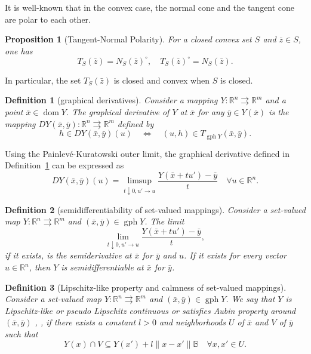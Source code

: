 \documentclass[11pt]{article}
\numberwithin{equation}{section}
\newtheorem{definition}{Definition}[section]
\newtheorem{proposition}{Proposition}[section]
\begin{document}
{It is well-known that in the convex case, the normal cone and the tangent cone are polar to each other.

\begin{proposition} [Tangent-Normal Polarity] \cite[Theorem 6.28]{RoWe98}\label{prop_polar} For a closed convex set $S$ and $\bar{z} \in S$, one has
$$
T_{S}(\bar{z})=N_{S}(\bar{z})^{\circ}, \quad T_{S}(\bar{z})^{\circ}=N_{S}(\bar{z}) .
$$
\end{proposition}

In particular, the set $T_{S}(\bar{z})$ is closed and convex when $S$ is closed.

\begin{definition}[graphical derivatives]\cite[Definition 8.33]{RoWe98}\label{def2.2} Consider a mapping $Y: \mathbb{R}^n \rightrightarrows \mathbb{R}^m$ and a point $\bar{x} \in \operatorname{dom} Y$. The graphical derivative of $Y$ at $\bar{x}$ for any $\bar{y} \in Y(\bar{x})$ is the mapping $D Y(\bar{x},\bar{y}): \mathbb{R}^n \rightrightarrows \mathbb{R}^m$ defined by
$$
h \in D Y(\bar{x},\bar{y})(u) \quad\Longleftrightarrow \quad (u, h) \in T_{\operatorname{gph} Y}(\bar{x}, \bar{y}).
$$
\end{definition}

Using the Painlevé-Kuratowski outer limit, the graphical derivative defined in Definition~\ref{def2.2} can be expressed as
\begin{equation}\label{Graphical}
D Y(\bar{x},\bar{y})(u) = \limsup_{t \downarrow 0, u' \to u} \frac{Y(\bar x+tu')-\bar y}{t} \quad \forall u\in\mathbb{R}^n.
\end{equation}

\begin{definition}[semidifferentiability of set-valued mappings]\cite[page 332]{RoWe98}\label{semid-set}
Consider  a set-valued map $Y: \mathbb{R}^n \rightrightarrows \mathbb{R}^m$ and $(\bar x,\bar y) \in  \operatorname{gph}Y$. The limit
$$\lim_{t \downarrow 0, u' \to u} \frac{Y(\bar x+tu')-\bar y}{t},$$
if it exists, is the semiderivative at $\bar x$ for $\bar y$ and $u$. If it exists for every vector $u \in \mathbb{R}^n$, then $Y$ is semidifferentiable at $\bar x$ for $\bar y$.
\end{definition}

\begin{definition}[Lipschitz-like property and calmness of set-valued mappings]\label{lip-calm}
Consider  a set-valued map $Y: \mathbb{R}^n \rightrightarrows \mathbb{R}^m$ and $(\bar x,\bar y) \in  \operatorname{gph}Y$. We say that $Y$ is Lipschitz-like or pseudo Lipschitz continuous or satisfies Aubin property around $(\bar x,\bar y)$ \cite[Definition 1]{Aubin84},  \cite{DoRo2009}, if
there exists a constant $l>0$ and neighborhoods $U$ of $\bar x$ and $V$ of  $\bar y$ such that
$$Y(x) \cap V \subseteq Y(x')+l\|x-x'\|\mathbb{B} \quad \forall x,x'\in U.$$


\end{definition}}
\end{document}
